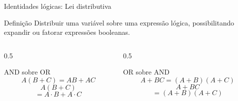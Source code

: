 
\begin{frame}{Identidades lógicas: Lei distributiva}
    
    \begin{block}{Definição}
        Distribuir uma variável sobre uma expressão lógica,
        possibilitando expandir ou fatorar expressões booleanas.
    \end{block}

    \begin{columns}[T]

        \begin{column}{0.5\textwidth}
            \begin{block}{AND sobre OR}
                \[
                    \boxed{A(B+C)=AB+AC}
                \]
                \[
                    A(B+C)
                \]
                \[
                    = A\cdot B + A\cdot C
                \]
            \end{block}
        \end{column}

        \begin{column}{0.5\textwidth}
            \begin{block}{OR sobre AND}
                \[
                    \boxed{A+BC=(A+B)(A+C)}
                \]
                \[
                    A+BC
                \]
                \[
                    = (A+B)(A+C)
                \]
            \end{block}
        \end{column}

    \end{columns}

\end{frame}